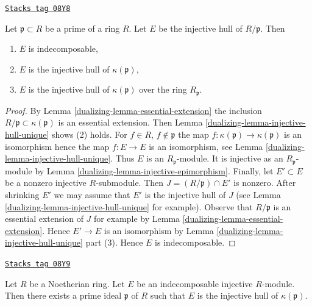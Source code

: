 \begin{lemma}
\label{dualizing-lemma-injective-hull-indecomposable}
\href{https://stacks.math.columbia.edu/tag/08Y8}{\texttt{Stacks tag 08Y8}}

Let $\mathfrak p \subset R$ be a prime of a ring $R$.
Let $E$ be the injective hull of $R/\mathfrak p$. Then
\begin{enumerate}
\item $E$ is indecomposable,
\item $E$ is the injective hull of $\kappa(\mathfrak p)$,
\item $E$ is the injective hull of $\kappa(\mathfrak p)$
over the ring $R_\mathfrak p$.
\end{enumerate}
\end{lemma}

\begin{proof}

By Lemma \ref{dualizing-lemma-essential-extension} the inclusion
$R/\mathfrak p \subset \kappa(\mathfrak p)$ is an essential
extension. Then Lemma \ref{dualizing-lemma-injective-hull-unique}
shows (2) holds. For $f \in R$, $f \not \in \mathfrak p$
the map $f : \kappa(\mathfrak p) \to \kappa(\mathfrak p)$ is an isomorphism
hence the map $f : E \to E$ is an isomorphism,
see Lemma \ref{dualizing-lemma-injective-hull-unique}.
Thus $E$ is an $R_\mathfrak p$-module. It is injective
as an $R_\mathfrak p$-module by Lemma \ref{dualizing-lemma-injective-epimorphism}.
Finally, let $E' \subset E$ be a nonzero injective $R$-submodule.
Then $J = (R/\mathfrak p) \cap E'$ is nonzero. After shrinking $E'$
we may assume that $E'$ is the injective hull of $J$ (see
Lemma \ref{dualizing-lemma-injective-hull-unique} for example).
Observe that $R/\mathfrak p$ is an essential extension of $J$ for example by
Lemma \ref{dualizing-lemma-essential-extension}. Hence $E' \to E$
is an isomorphism by Lemma \ref{dualizing-lemma-injective-hull-unique} part (3).
Hence $E$ is indecomposable.
\end{proof}

\begin{lemma}
\label{dualizing-lemma-indecomposable-injective-noetherian}
\href{https://stacks.math.columbia.edu/tag/08Y9}{\texttt{Stacks tag 08Y9}}

Let $R$ be a Noetherian ring. Let $E$ be an indecomposable injective
$R$-module. Then there exists a prime ideal $\mathfrak p$ of $R$ such that
$E$ is the injective hull of $\kappa(\mathfrak p)$.
\end{lemma}

